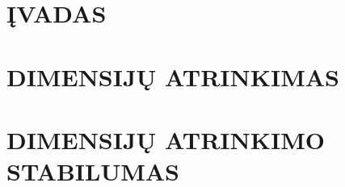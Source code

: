 \documentclass{article}
\begin{document}


\let \savenumberline \numberline
\def \numberline#1{\savenumberline{#1.}}
\tableofcontents 

\section*{ĮVADAS}


\section{DIMENSIJŲ ATRINKIMAS}



\section{DIMENSIJŲ ATRINKIMO STABILUMAS}





\end{document}
